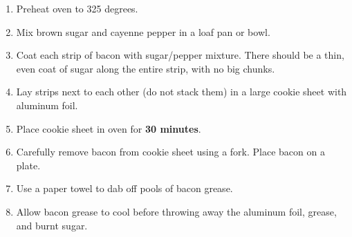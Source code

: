 \documentclass[letterpaper]{recipe}
\begin{document}
 


\begin{enumerate}
\addtolength{\itemindent}{2em}
\item Preheat oven to 325 degrees.
\item Mix brown sugar and cayenne pepper in a loaf pan or bowl.
\item Coat each strip of bacon with sugar/pepper mixture.  There should be a thin, even coat of sugar
along the entire strip, with no big chunks.
\item Lay strips next to each other (do not stack them) in a large cookie sheet with aluminum foil.
\item Place cookie sheet in oven for {\bf 30 minutes}.
\item Carefully remove bacon from cookie sheet using a fork.  Place bacon on a plate.
\item Use a paper towel to dab off pools of bacon grease.
\item Allow bacon grease to cool before throwing away the aluminum foil, grease, and burnt sugar.
\end{enumerate}
\end{document}
